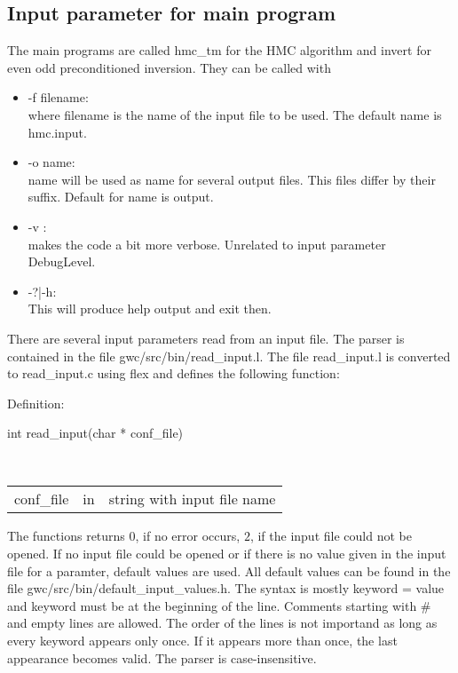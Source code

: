 \subsection{Input parameter for main program}

The main programs are called {\ttfamily hmc\_tm} for the HMC algorithm
and {\ttfamily invert} for even odd preconditioned inversion. They can
be called with
\begin{itemize}
\item {\ttfamily -f filename}:\\
  where {\ttfamily filename} is the name of the input file to be
  used. The default name is {\ttfamily hmc.input}.

\item {\ttfamily -o name}:\\
  {\ttfamily name} will be used as name for several output files. This
  files differ by their suffix. Default for {\ttfamily name} is
  {\ttfamily output}.

\item {\ttfamily -v  }:\\
  makes the code a bit more verbose. Unrelated to input parameter
  {\ttfamily DebugLevel}.

\item {\ttfamily -?|-h}:\\
  This will produce help output and exit then.

\end{itemize}

There are several input parameters read from an input file. The parser
is contained in the file {\ttfamily gwc/src/bin/read\_input.l}. The
file {\ttfamily read\_input.l} is converted to {\ttfamily
  read\_input.c} using {\ttfamily flex} and defines the following
function: 

Definition:\\
\begin{ttfamily}
  int read\_input(char * conf\_file)
\end{ttfamily}\\

\begin{tabular}[h]{l l l}
{\ttfamily conf\_file} & in & string with input file name\\ 
\end{tabular}

The functions returns $0$, if no error occurs, $2$, if the input file
could not be opened. If no input file could be opened or if there is
no value given in the input file for a paramter, default values are
used. All default values can be found in the file {\ttfamily
  gwc/src/bin/default\_input\_values.h}. The syntax is mostly
{\ttfamily keyword = value} and {\ttfamily keyword} must be at the
beginning of the line. Comments starting with {\ttfamily \#} and empty
lines are allowed. The order of the lines is not importand as long as
every keyword appears only once.  If it appears more than once, the
last appearance becomes valid. The parser is case-insensitive.

